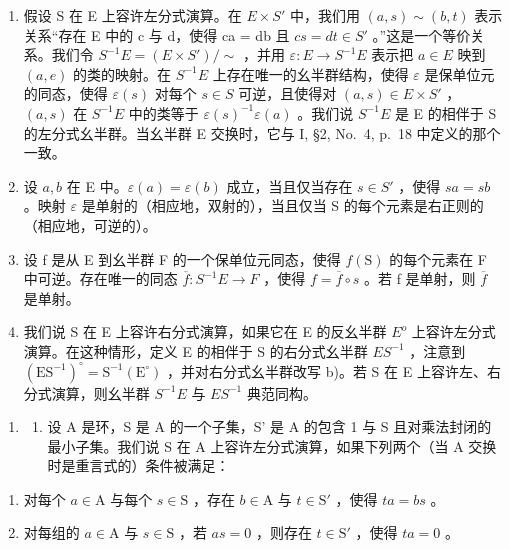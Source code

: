 \begin{enumerate}
\def\labelenumi{\alph{enumi})}
\setcounter{enumi}{1}
\item
  假设 S 在 E 上容许左分式演算。在 \(E \times S'\) 中，我们用 \((a, s) \sim (b, t)\) 表示关系``存在 E 中的 c 与 d，使得 ca = db 且 \(cs = dt \in S'\) 。''这是一个等价关系。我们令 \(S^{-1}E = (E \times S') / \sim\) ，并用 \(\varepsilon : E \to S^{-1}E\) 表示把 \(a \in E\) 映到 \((a, e)\) 的类的映射。在 \(S^{-1}E\) 上存在唯一的幺半群结构，使得 \(\varepsilon\) 是保单位元的同态，使得 \(\varepsilon(s)\) 对每个 \(s \in S\) 可逆，且使得对 \((a, s) \in E \times S'\) ，\((a, s)\) 在 \(S^{-1}E\) 中的类等于 \(\varepsilon(s)^{-1}\varepsilon(a)\) 。我们说 \(S^{-1}E\) 是 E 的相伴于 S 的左分式幺半群。当幺半群 E 交换时，它与 I, §2, No.~4, p.~18 中定义的那个一致。
\item
  设 \(a, b\) 在 E 中。\(\varepsilon(a) = \varepsilon(b)\) 成立，当且仅当存在 \(s \in S'\) ，使得 \(sa = sb\) 。映射 \(\varepsilon\) 是单射的（相应地，双射的），当且仅当 S 的每个元素是右正则的（相应地，可逆的）。
\item
  设 f 是从 E 到幺半群 F 的一个保单位元同态，使得 \(f(\mathrm{S})\) 的每个元素在 F 中可逆。存在唯一的同态 \(\overline{f}: S^{-1}E \to F\) ，使得 \(f = \overline{f} \circ s\) 。若 f 是单射，则 \(\overline{f}\) 是单射。
\item
  我们说 S 在 E 上容许右分式演算，如果它在 E 的反幺半群 \(E^{o}\) 上容许左分式演算。在这种情形，定义 E 的相伴于 S 的右分式幺半群 \(ES^{-1}\) ，注意到 \((\mathrm{ES}^{-1})^{\circ} = \mathrm{S}^{-1}(\mathrm{E}^{\circ})\) ，并对右分式幺半群改写 b)。若 S 在 E 上容许左、右分式演算，则幺半群 \(S^{-1}E\) 与 \(ES^{-1}\) 典范同构。
\end{enumerate}

\begin{enumerate}
\def\labelenumi{\arabic{enumi})}
\setcounter{enumi}{17}
\tightlist
\item
  \begin{enumerate}
  \def\labelenumii{\alph{enumii})}
  \tightlist
  \item
    设 A 是环，S 是 A 的一个子集，S' 是 A 的包含 1 与 S 且对乘法封闭的最小子集。我们说 S 在 A 上容许左分式演算，如果下列两个（当 A 交换时是重言式的）条件被满足：
  \end{enumerate}
\end{enumerate}

\begin{enumerate}
\def\labelenumi{(\roman{enumi})}
\item
  对每个 \(a \in \mathrm{A}\) 与每个 \(s \in \mathrm{S}\) ，存在 \(b \in \mathrm{A}\) 与 \(t \in \mathrm{S}'\) ，使得 \(ta = bs\) 。
\item
  对每组的 \(a \in \mathrm{A}\) 与 \(s \in \mathrm{S}\) ，若 \(as = 0\) ，则存在 \(t \in \mathrm{S}'\) ，使得 \(ta = 0\) 。
\end{enumerate}

